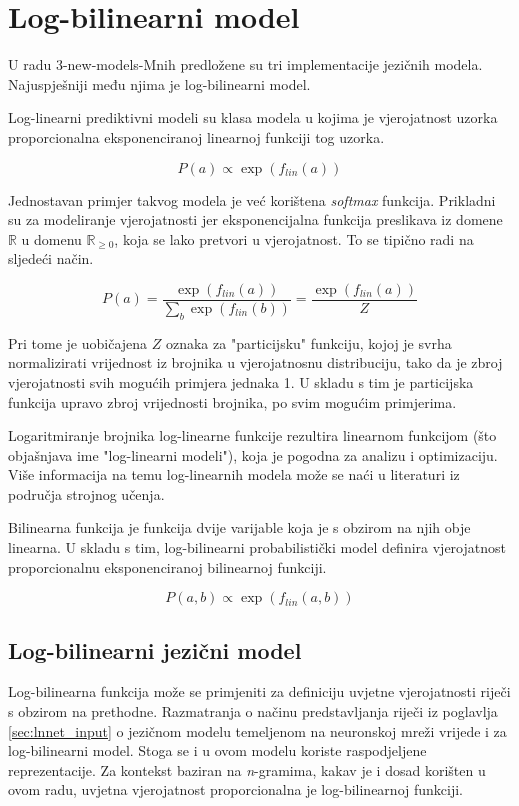 \documentclass[times, utf8, diplomski, numeric]{fer}
\begin{document}
\chapter{Log-bilinearni model}
\label{sec:lbl}

U radu \cite{MnihH07} 3-new-models-Mnih predložene su tri implementacije jezičnih modela. Najuspješniji među njima je log-bilinearni model.

Log-linearni prediktivni modeli su klasa modela u kojima je vjerojatnost uzorka proporcionalna eksponenciranoj linearnoj funkciji tog uzorka.

\[
P(a) \propto \exp(f_{lin}(a))
\]

 Jednostavan primjer takvog modela je već korištena \textit{softmax} funkcija. Prikladni su za modeliranje vjerojatnosti jer eksponencijalna funkcija preslikava iz domene $\mathbb{R}$ u domenu $\mathbb{R}_{\geq 0}$, koja se lako pretvori u vjerojatnost. To se tipično radi na sljedeći način.

\[
P(a) = \frac{\exp(f_{lin}(a))}{ \sum_b \exp(f_{lin}(b))} = \frac{\exp(f_{lin}(a))}{Z}
\]

Pri tome je uobičajena $Z$ oznaka za "particijsku" funkciju, kojoj je svrha normalizirati vrijednost iz brojnika u vjerojatnosnu distribuciju, tako da je zbroj vjerojatnosti svih mogućih primjera jednaka 1. U skladu s tim je particijska funkcija upravo zbroj vrijednosti brojnika, po svim mogućim primjerima.

 Logaritmiranje brojnika log-linearne funkcije rezultira linearnom funkcijom (što objašnjava ime "log-linearni modeli"), koja je pogodna za analizu i optimizaciju. Više informacija na temu log-linearnih modela može se naći u literaturi iz područja strojnog učenja.

Bilinearna funkcija je funkcija dvije varijable koja je s obzirom na njih obje linearna. U skladu s tim, log-bilinearni probabilistički model definira vjerojatnost proporcionalnu eksponenciranoj bilinearnoj funkciji.

\[
P(a, b) \propto \exp(f_{lin}(a, b))
\]

\section{Log-bilinearni jezični model}

Log-bilinearna funkcija može se primjeniti za definiciju uvjetne vjerojatnosti riječi s obzirom na prethodne. Razmatranja o načinu predstavljanja riječi iz poglavlja \ref{sec:lnnet_input} o jezičnom modelu temeljenom na neuronskoj mreži vrijede i za log-bilinearni model. Stoga se i u ovom modelu koriste raspodjeljene reprezentacije. Za kontekst baziran na \textit{n}-gramima, kakav je i dosad korišten u ovom radu, uvjetna vjerojatnost proporcionalna je log-bilinearnoj funkciji.
\end{document}
